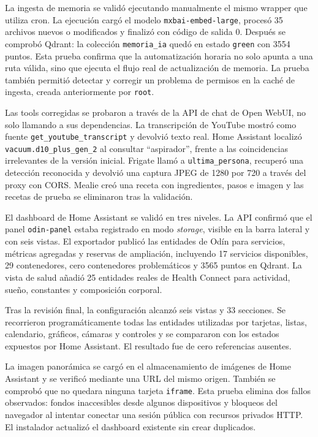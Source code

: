 La ingesta de memoria se validó ejecutando manualmente el mismo wrapper que utiliza cron. La ejecución cargó el modelo \texttt{mxbai-embed-large}, procesó 35 archivos nuevos o modificados y finalizó con código de salida 0. Después se comprobó Qdrant: la colección \texttt{memoria\_ia} quedó en estado \texttt{green} con 3554 puntos. Esta prueba confirma que la automatización horaria no solo apunta a una ruta válida, sino que ejecuta el flujo real de actualización de memoria. La prueba también permitió detectar y corregir un problema de permisos en la caché de ingesta, creada anteriormente por \texttt{root}.

Las tools corregidas se probaron a través de la API de chat de Open WebUI, no solo llamando a sus dependencias. La transcripción de YouTube mostró como fuente \texttt{get\_youtube\_transcript} y devolvió texto real. Home Assistant localizó \texttt{vacuum.d10\_plus\_gen\_2} al consultar ``aspirador'', frente a las coincidencias irrelevantes de la versión inicial. Frigate llamó a \texttt{ultima\_persona}, recuperó una detección reconocida y devolvió una captura JPEG de 1280 por 720 a través del proxy con CORS. Mealie creó una receta con ingredientes, pasos e imagen y las recetas de prueba se eliminaron tras la validación.

El dashboard de Home Assistant se validó en tres niveles. La API confirmó que el panel \texttt{odin-panel} estaba registrado en modo \textit{storage}, visible en la barra lateral y con seis vistas. El exportador publicó las entidades de Odín para servicios, métricas agregadas y reservas de ampliación, incluyendo 17 servicios disponibles, 29 contenedores, cero contenedores problemáticos y 3565 puntos en Qdrant. La vista de salud añadió 25 entidades reales de Health Connect para actividad, sueño, constantes y composición corporal.

Tras la revisión final, la configuración alcanzó seis vistas y 33 secciones. Se recorrieron programáticamente todas las entidades utilizadas por tarjetas, listas, calendario, gráficos, cámaras y controles y se compararon con los estados expuestos por Home Assistant. El resultado fue de cero referencias ausentes.

La imagen panorámica se cargó en el almacenamiento de imágenes de Home Assistant y se verificó mediante una URL del mismo origen. También se comprobó que no quedara ninguna tarjeta \texttt{iframe}. Esta prueba elimina dos fallos observados: fondos inaccesibles desde algunos dispositivos y bloqueos del navegador al intentar conectar una sesión pública con recursos privados HTTP. El instalador actualizó el dashboard existente sin crear duplicados.

